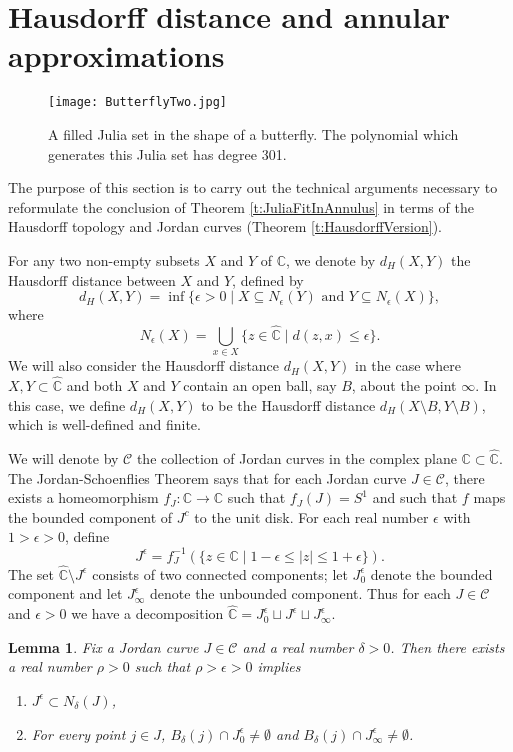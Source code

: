 \documentclass[a4paper,11pt,onecolumn]{amsart}
\newtheorem{lemma}[theorem]{Lemma}
\theoremstyle{definition}
\begin{document}
\section{Hausdorff distance and annular approximations}

  \begin{figure}[!h] 
  \centering
  \texttt{[image: ButterflyTwo.jpg]}
  \caption[]{A filled Julia set in the shape of a butterfly.  The polynomial which generates this Julia set has degree 301.
  }
  \end{figure}

The purpose of this section is to carry out the technical arguments necessary to reformulate the conclusion of Theorem \ref{t:JuliaFitInAnnulus} in terms of the Hausdorff topology and Jordan curves (Theorem \ref{t:HausdorffVersion}).

 For any two non-empty subsets $X$ and $Y$ of $\mathbb{C}$, we denote by $d_H(X,Y)$ the Hausdorff distance between $X$ and $Y$, defined by $$d_H(X,Y) = \inf \{\epsilon > 0 \mid X \subseteq N_{\epsilon}(Y) \textrm{ and } Y \subseteq N_{\epsilon}(X)\},$$ where $$N_{\epsilon}(X) = \bigcup_{x \in X} \{z \in \hat{\mathbb{C}} \mid d(z,x) \leq \epsilon\}.$$  We will also consider the Hausdorff distance $d_H(X,Y)$ in the case where $X,Y \subset \hat{\mathbb{C}}$ and both $X$ and $Y$ contain an open ball, say $B$, about the point $\infty$.  In this case, we define $d_H(X,Y)$ to be the Hausdorff distance $d_H(X \setminus B, Y \setminus B)$, which is well-defined and finite.  

We will denote by $\mathcal{C}$ the collection of Jordan curves in the complex plane $\mathbb{C} \subset \hat{\mathbb{C}}$.  The Jordan-Schoenflies Theorem says that for each Jordan curve $J \in \mathcal{C}$, there exists a homeomorphism $f_J:\mathbb{C} \rightarrow \mathbb{C}$ such that $f_J(J) = S^1$ and such that $f$ maps the bounded component of $J^c$ to the unit disk.  For each real number $\epsilon$ with $1 > \epsilon>0$, define 
$$J^{\epsilon} = f_J^{-1}(\{z \in \mathbb{C} \mid 1-\epsilon \leq  |z| \leq 1+\epsilon \}).$$  
The set  $\hat{\mathbb{C}} \setminus J^{\epsilon}$ consists of two connected components; let $J^{\epsilon}_0$ denote the bounded component and let $J^{\epsilon}_{\infty}$ denote the unbounded component.  Thus for each $J \in \mathcal{C}$ and $\epsilon > 0$ we have a decomposition $\hat{\mathbb{C}} = J^{\epsilon}_0 \sqcup J^{\epsilon} \sqcup J^{\epsilon}_{\infty}$.  

\begin{lemma} \label{l:approxbyannuli}
Fix a Jordan curve $J \in \mathcal{C}$ and a real number $\delta >0$.  Then there exists a real number $\rho > 0$ such that $\rho > \epsilon > 0$ implies 
\begin{enumerate}
\item $J^{\epsilon} \subset N_{\delta}(J)$, 
\item For every point $j \in J$, $B_{\delta}(j) \cap J^{\epsilon}_0 \not = \emptyset$ and $B_{\delta}(j) \cap J^{\epsilon}_{\infty} \not = \emptyset$.
\end{enumerate}
\end{lemma}
\end{document}
